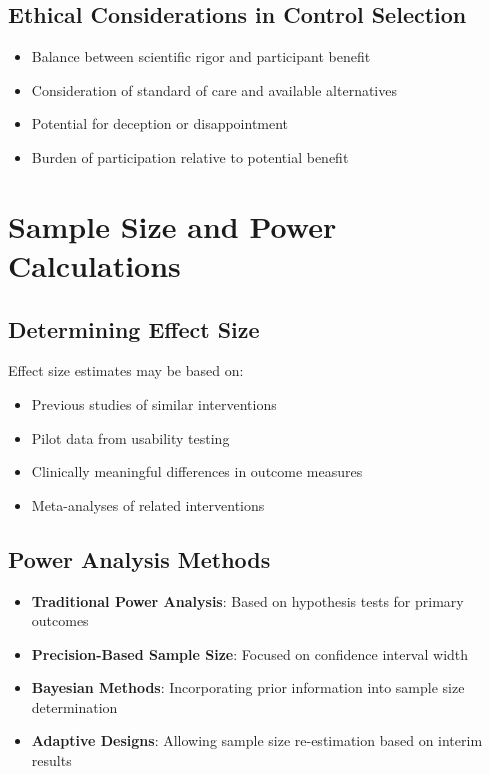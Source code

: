 \subsection{Ethical Considerations in Control Selection}
\begin{itemize}
    \item Balance between scientific rigor and participant benefit
    \item Consideration of standard of care and available alternatives
    \item Potential for deception or disappointment
    \item Burden of participation relative to potential benefit
\end{itemize}

\section{Sample Size and Power Calculations}
\subsection{Determining Effect Size}
Effect size estimates may be based on:

\begin{itemize}
    \item Previous studies of similar interventions
    \item Pilot data from usability testing
    \item Clinically meaningful differences in outcome measures
    \item Meta-analyses of related interventions
\end{itemize}

\subsection{Power Analysis Methods}
\begin{itemize}
    \item \textbf{Traditional Power Analysis}: Based on hypothesis tests for primary outcomes
    \item \textbf{Precision-Based Sample Size}: Focused on confidence interval width
    \item \textbf{Bayesian Methods}: Incorporating prior information into sample size determination
    \item \textbf{Adaptive Designs}: Allowing sample size re-estimation based on interim results
\end{itemize}

